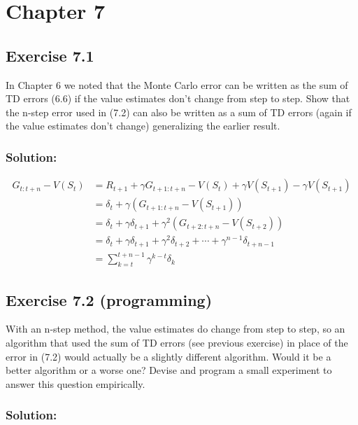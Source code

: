 \section*{Chapter 7}

\subsection*{Exercise 7.1}
In Chapter 6 we noted that the Monte Carlo error can be written as the
sum of TD errors (6.6) if the value estimates don't change from step to step. Show that
the n-step error used in (7.2) can also be written as a sum of TD errors (again if the
value estimates don't change) generalizing the earlier result. 

\subsubsection*{Solution:}

\begin{align*}
    G_{t:t+n} - V(S_t) &= R_{t+1} + \gamma G_{t+1:t+n} - V(S_t) + \gamma V(S_{t+1}) - \gamma V(S_{t+1}) \\
    &= \delta_t + \gamma (G_{t+1:t+n} - V(S_{t+1})) \\
    &= \delta_t + \gamma \delta_{t+1} + \gamma^2 (G_{t+2:t+n} - V(S_{t+2})) \\
    &= \delta_t + \gamma \delta_{t+1} + \gamma^2 \delta_{t+2} + \cdots + \gamma^{n-1} \delta_{t+n-1} \\
    &= \sum_{k=t}^{t+n-1} \gamma^{k-t} \delta_k
\end{align*}


\subsection*{Exercise 7.2 (programming)}
With an n-step method, the value estimates do change from
step to step, so an algorithm that used the sum of TD errors (see previous exercise) in
place of the error in (7.2) would actually be a slightly different algorithm. Would it be a
better algorithm or a worse one? Devise and program a small experiment to answer this
question empirically.

\subsubsection*{Solution:}


